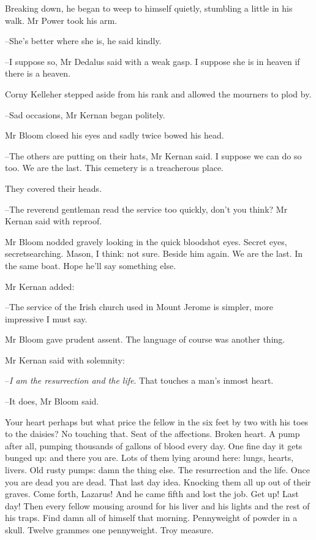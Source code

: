 Breaking down, he began to weep to himself quietly,
stumbling a little in his walk.
Mr Power took his arm.

--She's better where she is,
he said kindly.

--I suppose so,
Mr Dedalus said with a weak gasp.
I suppose she is in heaven if there is a heaven.

Corny Kelleher stepped aside from his rank and allowed the mourners to plod by.

--Sad occasions,
Mr Kernan began politely.

Mr Bloom closed his eyes and sadly twice bowed his head.

--The others are putting on their hats,
Mr Kernan said.
I suppose we can do so too.
We are the last.
This cemetery is a treacherous place.

They covered their heads.

--The reverend gentleman read the service too quickly, don't you think?
Mr Kernan said with reproof.

Mr Bloom nodded gravely looking in the quick bloodshot eyes.
Secret eyes, secretsearching.
Mason, I think:
not sure.
Beside him again.
We are the last.
In the same boat.
Hope he'll say something else.

Mr Kernan added:

--The service of the Irish church used in Mount Jerome is simpler,
more impressive I must say.

Mr Bloom gave prudent assent.
The language of course was another thing.

Mr Kernan said with solemnity:

--\emph{I am the resurrection and the life}.
That touches a man's inmost heart.

--It does,
Mr Bloom said.

Your heart perhaps but what price the fellow
in the six feet by two
with his toes to the daisies?
No touching that.
Seat of the affections.
Broken heart.
A pump after all, pumping thousands of gallons of blood every day.
One fine day it gets bunged up:
and there you are.
Lots of them lying around here:
lungs, hearts, livers.
Old rusty pumps:
damn the thing else.
The resurrection and the life.
Once you are dead you are dead.
That last day idea.
Knocking them all up out of their graves.
Come forth, Lazarus!
And he came fifth and lost the job.
Get up!
Last day!
Then every fellow mousing around for his liver and his lights
and the rest of his traps.
Find damn all of himself that morning.
Pennyweight of powder in a skull.
Twelve grammes one pennyweight.
Troy measure.

